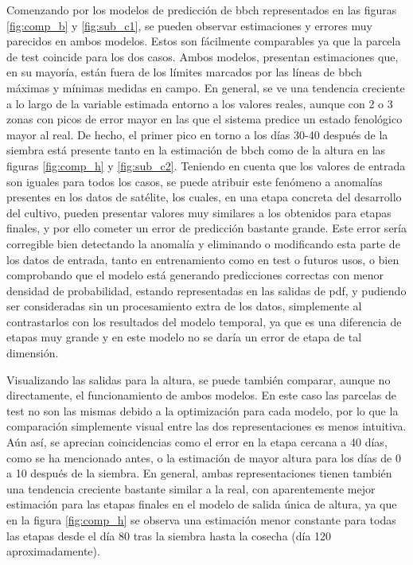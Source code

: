 \par Comenzando por los modelos de predicción de \gls{bbch} representados en las figuras \ref{fig:comp_b} y \ref{fig:sub_c1}, se pueden observar estimaciones y errores muy parecidos en ambos modelos. Estos son fácilmente comparables ya que la parcela de test coincide para los dos casos. Ambos modelos, presentan estimaciones que, en su mayoría, están fuera de los límites marcados por las líneas de \gls{bbch} máximas y mínimas medidas en campo. En general, se ve una tendencia creciente a lo largo de la variable estimada entorno a los valores reales, aunque con 2 o 3 zonas con picos de error mayor en las que el sistema predice un estado fenológico mayor al real. De hecho, el primer pico en torno a los días 30-40 después de la siembra está presente tanto en la estimación de \gls{bbch} como de la altura en las figuras \ref{fig:comp_h} y \ref{fig:sub_c2}. Teniendo en cuenta que los valores de entrada son iguales para todos los casos, se puede atribuir este fenómeno a anomalías presentes en los datos de satélite, los cuales, en  una etapa concreta del desarrollo del cultivo, pueden presentar valores muy similares a los obtenidos para etapas finales, y por ello cometer un error de predicción bastante grande. Este error sería corregible bien detectando la anomalía y eliminando o modificando esta parte de los datos de entrada, tanto en entrenamiento como en test o futuros usos, o bien comprobando que el modelo está generando predicciones correctas con menor densidad de probabilidad, estando representadas en las salidas de \gls{pdf}, y pudiendo ser consideradas sin un procesamiento extra de los datos, simplemente al contrastarlos con los resultados del modelo temporal, ya que es una diferencia de etapas muy grande y en este modelo no se daría un error de etapa de tal dimensión. 
\\
\par Visualizando las salidas para la altura, se puede también comparar, aunque no directamente, el funcionamiento de ambos modelos. En este caso las parcelas de test no son las mismas debido a la optimización para cada modelo, por lo que la comparación simplemente visual entre las dos representaciones es menos intuitiva. Aún así, se aprecian coincidencias como el error en la etapa cercana a 40 días, como se ha mencionado antes, o la estimación de mayor altura para los días de 0 a 10 después de la siembra. En general, ambas representaciones tienen también una tendencia creciente bastante similar a la real, con aparentemente mejor estimación para las etapas finales en el modelo de salida única de altura, ya que en la figura \ref{fig:comp_h} se observa una estimación menor constante para todas las etapas desde el día 80 tras la siembra hasta la cosecha (día 120 aproximadamente).

